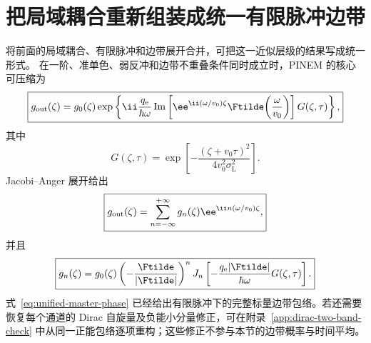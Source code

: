 \section{把局域耦合重新组装成统一有限脉冲边带}

将前面的局域耦合、有限脉冲和边带展开合并，可把这一近似层级的结果写成统一形式。
在一阶、准单色、弱反冲和边带不重叠条件同时成立时，PINEM 的核心可压缩为
\begin{equation}
\boxed{
g_{\rm out}(\zeta)
=
g_0(\zeta)
\exp\left\{
\ii\frac{q_{\rm e}}{\hbar\omega}
\operatorname{Im}\left[
\ee^{\ii(\omega/v_0)\zeta}
\Ftilde\!\left(\frac{\omega}{v_0}\right)
\right]
G(\zeta,\tau)
\right\},}
\label{eq:unified-master-phase}
\end{equation}
其中
\[
G(\zeta,\tau)
=
\exp\left[
-\frac{(\zeta+v_0\tau)^2}
{4v_0^2\sigma_{\mathrm L}^2}
\right].
\]
Jacobi--Anger 展开给出
\begin{equation}
\boxed{
g_{\rm out}(\zeta)
=
\sum_{n=-\infty}^{+\infty}
g_n(\zeta)
\ee^{\ii n(\omega/v_0)\zeta},}
\end{equation}
并且
\begin{equation}
\boxed{
g_n(\zeta)
=
g_0(\zeta)
\left(-\frac{\Ftilde}{|\Ftilde|}\right)^n
J_n\left[
-\frac{q_{\rm e}|\Ftilde|}{\hbar\omega}
G(\zeta,\tau)
\right].}
\label{eq:unified-gn}
\end{equation}
式~\eqref{eq:unified-master-phase} 已经给出有限脉冲下的完整标量边带包络。若还需要恢复每个通道的 Dirac 自旋量及负能小分量修正，可在附录~\ref{app:dirac-two-band-check} 中从同一正能包络逐项重构；这些修正不参与本节的边带概率与时间平均。
